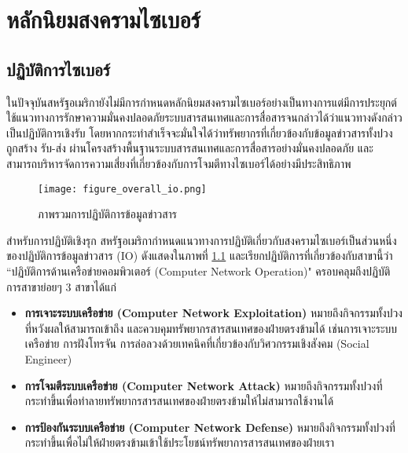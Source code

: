 \documentclass[../th_cyber_warfare_distilled.tex]{subfiles}
\begin{document}
\chapter{หลักนิยมสงครามไซเบอร์}
\label{chapter:cyberwar_doctrine}
\section{ปฏิบัติการไซเบอร์}
ในปัจจุบันสหรัฐอเมริกายังไม่มีการกำหนดหลักนิยมสงครามไซเบอร์อย่างเป็นทางการแต่มีการประยุกต์ใช้แนวทางการรักษาความมั่นคงปลอดภัยระบบสารสนเทศและการสื่อสารจนกล่าวได้ว่าแนวทางดังกล่าวเป็นปฏิบัติการเชิงรับ โดยหากกระทำสำเร็จจะมั่นใจได้ว่าทรัพยากรที่เกี่ยวข้องกับข้อมูลข่าวสารทั้งปวงถูกสร้าง รับ-ส่ง ผ่านโครงสร้างพื้นฐานระบบสารสนเทศและการสื่อสารอย่างมั่นคงปลอดภัย และสามารถบริหารจัดการความเสี่ยงที่เกี่ยวข้องกับการโจมตีทางไซเบอร์ได้อย่างมีประสิทธิภาพ
\begin{figure}
	\texttt{[image: figure\_overall\_io.png]}
	\centering
	\caption{ภาพรวมการปฏิบัติการข้อมูลข่าวสาร}
	\label{figure:overall_io}
\end{figure}
สำหรับการปฏิบัติเชิงรุก สหรัฐอเมริกากำหนดแนวทางการปฏิบัติเกี่ยวกับสงครามไซเบอร์เป็นส่วนหนึ่งของปฏิบัติการข้อมูลข่าวสาร (IO) ดังแสดงในภาพที่ \ref{figure:overall_io} และเรียกปฏิบัติการที่เกี่ยวข้องกับสาขานี้ว่า ``ปฏิบัติการด้านเครือข่ายคอมพิวเตอร์ (Computer Network Operation)" ครอบคลุมถึงปฏิบัติการสาขาย่อยๆ 3 สาขาได้แก่
\begin{itemize}
	\item \textbf{การเจาะระบบเครือข่าย (Computer Network Exploitation)} หมายถึงกิจกรรมทั้งปวงที่หวังผลให้สามารถเข้าถึง และควบคุมทรัพยากรสารสนเทศของฝ่ายตรงข้ามได้ เช่นการเจาะระบบเครือข่าย การฝังโทรจัน การล่อลวงด้วยเทคนิคที่เกี่ยวข้องกับวิศวกรรมเชิงสังคม (Social Engineer) 
	\item \textbf{การโจมตีระบบเครือข่าย (Computer Network Attack)} หมายถึงกิจกรรมทั้งปวงที่กระทำขึ้นเพื่อทำลายทรัพยากรสารสนเทศของฝ่ายตรงข้ามให้ไม่สามารถใช้งานได้
	\item \textbf{การป้องกันระบบเครือข่าย (Computer Network Defense)}
	หมายถึงกิจกรรมทั้งปวงที่กระทำขึ้นเพื่อไม่ให้ฝ่ายตรงข้ามเข้าใช้ประโยชน์ทรัพยาการสารสนเทศของฝ่ายเรา
\end{itemize}
\end{document}
